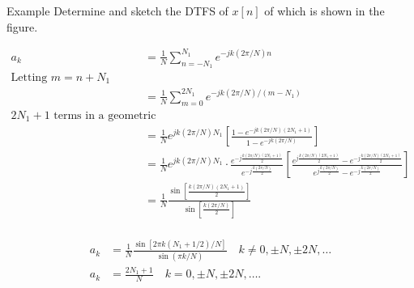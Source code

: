 \begin{frame}{Example}
    Determine and sketch the DTFS of $x[n]$ of which is shown in the figure.
    \begin{figure}
        \centering
        
    \end{figure}
    \pause
\end{frame}


\begin{frame}
    {
        \begin{align*}
                a_k &= \frac{1}{N}\sum_{n=-N_1}^{N_1}e^{-jk(2\pi/N)n}\\
                \text{Letting~} m = n+N_1&\\
                &= \frac{1}{N}\sum_{m=0}^{2N_1}e^{-jk(2\pi/N)/(m- N_1)}\\
                2N_1 + 1\text{~terms in a geometric series}&\\
                &= \frac{1}{N}e^{jk(2\pi/N)N_1}\left[\frac{1 - e^{-jk(2\pi/N)(2N_1 + 1)}}{1 - e^{-jk(2\pi/N)}}\right]\\
                &=  \frac{1}{N} e^{jk(2\pi/N)N_1} \cdot
                \frac{
                    e^{-j\frac{k(2\pi/N)(2N_1+1)}{2}}
                }{
                e^{-j\frac{k(2\pi/N)}{2}}
                } \left[
                \frac{e^{j\frac{k(2\pi/N)(2N_1+1)}{2}}  - e^{-j\frac{k(2\pi/N)(2N_1+1)}{2}} }
                {e^{j\frac{k(2\pi/N)}{2}} - e^{-j\frac{k(2\pi/N)}{2}}}\right]\\
                &=  \frac{1}{N} \frac{\sin\left[ \frac{k(2\pi/N)(2N_1+1)}{2} \right]}{\sin\left[\frac{k(2\pi/N)}{2}\right]}\\
        \end{align*}
    }
\end{frame}

\begin{frame}
    {
        \begin{align*}
                a_k &=  \frac{1}{N} \frac{\sin\left[ 2\pi k(N_1+1/2)/N \right]}{\sin(\pi k/N)}\quad k \neq 0, \pm N, \pm 2N, \dots\\
                a_k &= \frac{2N_1+1}{N}\quad k = 0, \pm N, \pm 2N, \dots.
        \end{align*}
    }
\end{frame}

\begin{frame}
    \begin{figure}
        \centering
        
    \end{figure}
\end{frame}



